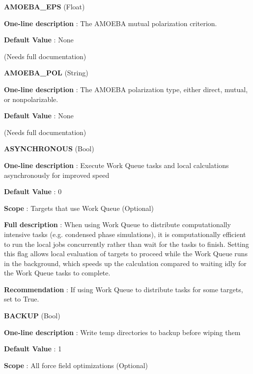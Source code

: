 \begin{DoxyItemize}
\item {\bfseries  A\-M\-O\-E\-B\-A\-\_\-\-E\-P\-S } (Float) \par
{\bfseries  One-\/line description }\-: The A\-M\-O\-E\-B\-A mutual polarization criterion. \par
{\bfseries  Default Value }\-: None \par
(Needs full documentation)\end{DoxyItemize}
\begin{DoxyItemize}
\item {\bfseries  A\-M\-O\-E\-B\-A\-\_\-\-P\-O\-L } (String) \par
{\bfseries  One-\/line description }\-: The A\-M\-O\-E\-B\-A polarization type, either direct, mutual, or nonpolarizable. \par
{\bfseries  Default Value }\-: None \par
(Needs full documentation)\end{DoxyItemize}
\begin{DoxyItemize}
\item {\bfseries  A\-S\-Y\-N\-C\-H\-R\-O\-N\-O\-U\-S } (Bool) \par
{\bfseries  One-\/line description }\-: Execute Work Queue tasks and local calculations asynchronously for improved speed \par
{\bfseries  Default Value }\-: 0 \par
{\bfseries  Scope }\-: Targets that use Work Queue (Optional) \par
{\bfseries  Full description }\-: When using Work Queue to distribute computationally intensive tasks (e.\-g. condensed phase simulations), it is computationally efficient to run the local jobs concurrently rather than wait for the tasks to finish. Setting this flag allows local evaluation of targets to proceed while the Work Queue runs in the background, which speeds up the calculation compared to waiting idly for the Work Queue tasks to complete. \par
{\bfseries  Recommendation }\-: If using Work Queue to distribute tasks for some targets, set to True.\end{DoxyItemize}
\begin{DoxyItemize}
\item {\bfseries  B\-A\-C\-K\-U\-P } (Bool) \par
{\bfseries  One-\/line description }\-: Write temp directories to backup before wiping them \par
{\bfseries  Default Value }\-: 1 \par
{\bfseries  Scope }\-: All force field optimizations (Optional)\end{DoxyItemize}

